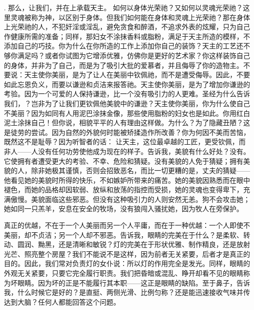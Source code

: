 . 那么，让我们，并在上承载天主。 如何以身体光荣祂？又如何以灵魂光荣祂？这里灵魂被称为神，以区别于身体。但我们如何能在身体和灵魂上光荣祂？那在身体上光荣祂的人，不犯奸淫或淫乱，避免贪食和醉酒，不追求外表的炫耀，只为自己作健康所需的准备；同样，那妇女不涂抹香料或脂粉，满足于天主所造的模样，不添加自己的巧技。你为什么在你所造的工作上添加你自己的装饰？天主的工艺还不够你满足吗？或者你试图为它增添优雅，仿佛你是更好的艺术家？你这样装饰自己的身体，并非为了自己，而是为了吸引大批的爱慕者，并且侮辱了你的造物主。不要说：天主使你美丽，是为了让人在美丽中钦佩祂，而不是遭受侮辱。因此，不要如此忘恩负义，而要以谦逊和贞洁来报答祂。天主使你美丽，是为了增加你谦逊的考验。因为一个可爱的人保持谦逊，比一个没有吸引力的人更难。圣经为什么告诉我们，？岂非为了让我们更钦佩他美貌中的谦逊？天主使你美丽，你为什么使自己不美丽？因为如同有人用泥巴涂抹金像，那些使用脂粉的妇女也是如此。你用红白泥土涂抹自己！但你说，相貌平平的人有理由这样做。为什么？为了隐藏丑陋？这是徒劳的尝试。因为自然的外貌何时能被矫揉造作所改善？你为何因不美而苦恼，既然这不是耻辱？因为听智者的话： 让天主，这位最卓越的工匠，更受钦佩，而非人——人没有任何功劳使他成为现在的样子。告诉我，美貌有什么好处？没有。它使拥有者遭受更大的考验、不幸、危险和猜疑。没有美貌的人免于猜疑；拥有美貌的人，除非她极其谨慎，否则会招致恶名，而比一切更糟的是，丈夫的猜疑——他看见她的美貌时所得的快乐，不如嫉妒所带来的痛苦。她的美貌因熟悉而在眼中褪色，而她的品格却因软弱、放纵和放荡的指控而受损，她的灵魂也变得卑下，充满傲慢。美貌面临这些邪恶。但没有这种吸引力的人则安然无恙。狗不会攻击她；她如同一只羔羊，安息在安全的牧场，没有狼闯入骚扰她，因为牧人在旁保护。\par

真正的优越，不在于一个人美丽而另一个人平庸，而在于一种优越：一个人即使不美丽，却不贞洁；另一个人却不邪恶。告诉我，眼睛的完美在于什么？是柔软、转动、圆润、黝黑，还是清晰和敏锐？灯的完美在于形状优雅、制作精良，还是放射光芒、照亮整个房屋？我们不能说不是这样，因为前者无关紧要，后者才是真正的目的。因此，我们常对负责灯的女仆说：所以灯的作用完全是发光。同样，眼睛的外观无关紧要，只要它完全履行职责。我们把昏暗或混乱、睁开却看不见的眼睛称为坏眼睛。因为坏的正是不能履行其本职——这正是眼睛的缺陷。至于鼻子，告诉我，什么时候它是好的？是直挺、两侧光滑、比例匀称？还是能迅速接收气味并传达到大脑？任何人都能回答这个问题。\par


